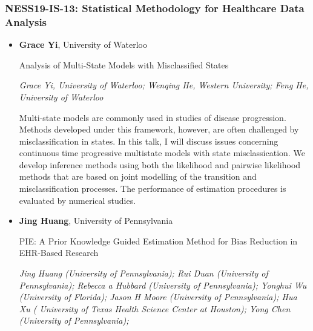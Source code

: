 \subsubsection*{NESS19-IS-13: Statistical Methodology for Healthcare Data Analysis}

\begin{itemize}
\item \textbf{Grace Yi}, University of Waterloo

Analysis of Multi-State Models with Misclassified States

\emph{\footnotesize Grace Yi, University of Waterloo; Wenqing He, Western University; Feng He, University of Waterloo}

Multi-state models are commonly used in studies of disease progression. Methods developed under this framework, however, are often challenged by misclassification in states. In this talk, I will discuss issues concerning continuous time progressive multistate models with state misclassication. We develop inference methods using both the likelihood and pairwise likelihood methods that are based on joint modelling of the transition and misclassification processes. The performance of estimation procedures is evaluated by numerical studies.

\item \textbf{Jing Huang}, University of Pennsylvania

PIE: A Prior Knowledge Guided Estimation Method for Bias Reduction in EHR-Based Research

\emph{\footnotesize Jing Huang (University of Pennsylvania);  Rui Duan (University of Pennsylvania);  Rebecca a Hubbard (University of Pennsylvania);  Yonghui Wu (University of Florida); Jason H Moore (University of Pennsylvania); Hua Xu ( University of Texas Health Science Center at Houston);  Yong Chen (University of Pennsylvania);}


\end{itemize}
